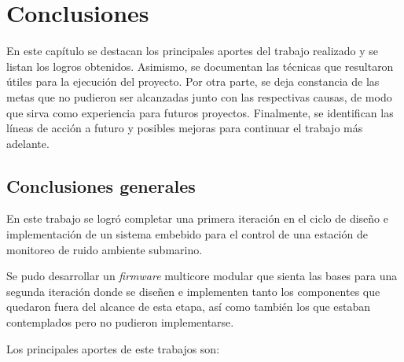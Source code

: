 
\chapter{Conclusiones} %

\label{Chapter5} %

En este capítulo se destacan los principales aportes del trabajo realizado y se listan los logros obtenidos.  Asimismo, se documentan las técnicas que resultaron  útiles para la ejecución del proyecto.  Por otra parte, se deja constancia de las metas que no pudieron ser alcanzadas junto con las respectivas causas, de modo que sirva como experiencia para futuros proyectos.  Finalmente, se identifican las líneas de acción a futuro y posibles mejoras para continuar el trabajo más adelante.


\section{Conclusiones generales }


En este trabajo se logró completar una primera iteración en el ciclo de diseño e implementación de un sistema embebido para el control de una estación de monitoreo de ruido ambiente submarino.  

Se pudo desarrollar un \textit{firmware} multicore modular que sienta las bases para una segunda iteración donde se diseñen e implementen tanto los componentes que quedaron fuera del alcance de esta etapa, así como también los que estaban contemplados pero no pudieron implementarse.

Los principales aportes de este trabajos son:

